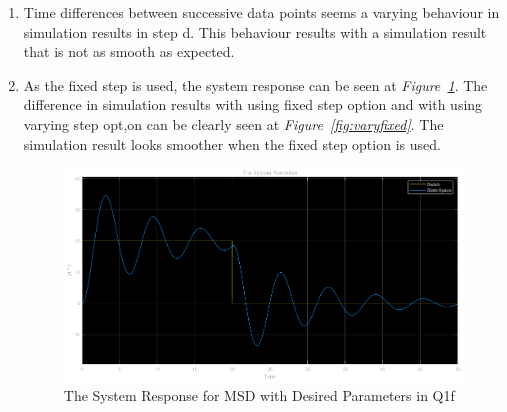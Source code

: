 \documentclass[a4paper,12pt]{article}
\begin{document}
\begin{enumerate}
\begin{enumerate}
			\item 	Time differences between successive data points seems a varying behaviour in simulation results in step d. This behaviour results with a simulation result that is not as smooth as expected.
				
				
				
			
			
			\item 	As the fixed step is used, the system response can be seen at \textit{Figure~\ref{fig:1f}}. The difference in simulation results with using fixed step option and with using varying step opt,on can be clearly seen at \textit{Figure~\ref{fig:varyfixed}}. The simulation result looks smoother when the fixed step option is used.
			
				\begin{figure}[H]
					\center
					\setlength{\unitlength}{\textwidth} 
					\includegraphics[width=0.8\unitlength]{images/1fey}
					\caption{\label{fig:1f} The System Response for MSD with Desired Parameters in Q1f  }
				\end{figure}
				

\end{enumerate}
\end{enumerate}
\end{document}
